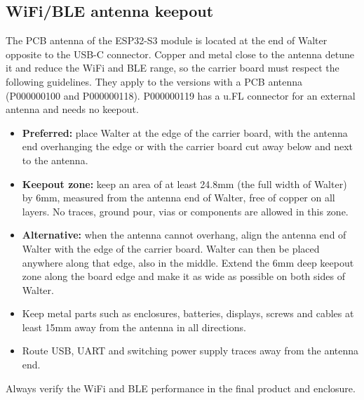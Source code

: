 \documentclass[11pt]{article}
\begin{document}
\subsection{WiFi/BLE antenna keepout} \label{antenna_keepout}
The PCB antenna of the ESP32-S3 module is located at the end of Walter opposite to the USB-C connector. Copper and metal close to the antenna detune it and reduce the WiFi and BLE range, so the carrier board must respect the following guidelines. They apply to the versions with a PCB antenna (P000000100 and P000000118). P000000119 has a u.FL connector for an external antenna and needs no keepout.
\begin{itemize}
	\item \textbf{Preferred:} place Walter at the edge of the carrier board, with the antenna end overhanging the edge or with the carrier board cut away below and next to the antenna.
	\item \textbf{Keepout zone:} keep an area of at least 24.8mm (the full width of Walter) by 6mm, measured from the antenna end of Walter, free of copper on all layers. No traces, ground pour, vias or components are allowed in this zone.
	\item \textbf{Alternative:} when the antenna cannot overhang, align the antenna end of Walter with the edge of the carrier board. Walter can then be placed anywhere along that edge, also in the middle. Extend the 6mm deep keepout zone along the board edge and make it as wide as possible on both sides of Walter.
	\item Keep metal parts such as enclosures, batteries, displays, screws and cables at least 15mm away from the antenna in all directions.
	\item Route USB, UART and switching power supply traces away from the antenna end.
\end{itemize}
Always verify the WiFi and BLE performance in the final product and enclosure.
\end{document}
